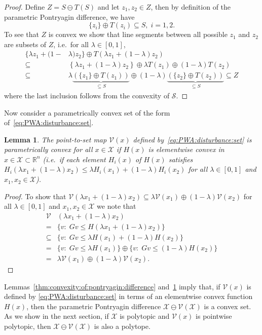 \documentclass[letterpaper, 10pt, conference]{ieeeconf} %
\newtheorem{thm}{Lemma}[section]
\begin{document}
%
\begin{proof}
Define $ Z =  S\ominus T( S)$ and let $z_1,z_2\in Z$, then
by definition of the parametric Pontryagin difference, we have
%
\[
        \{z_i\} \oplus T(z_i) \subseteq S,\; i=1,2.
\]
%
To see that $ Z$ is convex we show that line segments between
all possible $z_1$ and $z_2$ are subsets of $ Z$, i.e.~for all $\lambda \in [0,1]$,
\[\begin{aligned}
  \{ \lambda z_1 + (1-&\lambda)z_2
  \}\oplus T\left( \lambda z_1 + (1-\lambda)z_2\right)\\
  \subseteq&\left\{ \lambda z_1 + (1-\lambda)z_2
  \right\}\oplus \lambda T(z_1) \oplus (1-\lambda)
  T(z_2)\\
  \subseteq &\lambda\underbrace{(\{z_1\}\oplus T(z_1))}_{\subseteq S}\oplus
  (1-\lambda)\underbrace{(\{z_2\}\oplus T(z_2))}_{\subseteq S}
  \subseteq Z
\end{aligned}\]
%
where the last inclusion follows from the convexity of $\mathcal S$.
\end{proof}
%
%
Now consider a parametrically convex set of the form of~\eqref{eq:PWA:disturbance:set}.
\begin{thm}\label{thm:convex:parametric:set}
  The point-to-set map $\mathcal V (x)$ defined by~\eqref{eq:PWA:disturbance:set} is parametrically 
  convex for all $x\in \mathcal X$ if $H(x)$ is elementwise convex in $x\in \mathcal X\subset 
  \mathbb R^n$ (i.e.~if each element $H_i(x)$ of $H(x)$ satisfies $H_i(\lambda x_1+(1-\lambda)x_2)\leq 
  \lambda H_i(x_1)+(1-\lambda)H_i(x_2)$ for all    $\lambda\in[0,1]$ and $x_1, x_2\in\mathcal X$).
\end{thm}
%
\begin{proof}
To show that $\mathcal V(\lambda x_1 + (1-\lambda)x_2)\subseteq \lambda\mathcal V(x_1) \oplus(1-\lambda)
\mathcal V(x_2)$ for all $\lambda \in [0,1]$ and $x_1, x_2\in\mathcal X$ we note that
%
\begin{align*}
  \mathcal V&(\lambda x_1 + (1-\lambda)x_2)\\
  =& \{v:\; G v \leq H(\lambda x_1 + (1-\lambda)x_2)\}\\
  \subseteq& \{v:\;Gv\leq\lambda H(x_1)+(1-\lambda) H(x_2)\}\\
  =&\{v:\;Gv\leq\lambda H(x_1)\}\oplus\{v
  :\;Gv\leq(1-\lambda)H(x_2)\}\\
  =&\lambda\mathcal V(x_1)\oplus(1-\lambda)\mathcal V(x_2).
  \end{align*}
\baselineskip
\end{proof} 
%
%
\def\genmat{\Xi} \def\genvec{\xi}
Lemmas~\ref{thm:convexity:of:pontryagin:difference} and~\ref{thm:convex:parametric:set} imply that, 
if $\mathcal V(x)$ is defined by \eqref{eq:PWA:disturbance:set} in terms of an elementwise convex 
function $H(x)$, then the parametric Pontryagin difference $\mathcal X\ominus \mathcal V(\mathcal X)$
is a convex set.
As we show in the next section, if $\mathcal X$ is polytopic and $\mathcal 
V(x)$ is pointwise polytopic, then $\mathcal X\ominus\mathcal V(\mathcal X)$ is 
also a polytope. 
%
%
%
%
\end{document}
